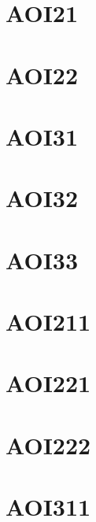 \documentclass[10pt,a4paper,twoside]{article}
\begin{document}

\section{AOI21}

\clearpage

\section{AOI22}

\clearpage

\section{AOI31}

\clearpage

\section{AOI32}

\clearpage

\section{AOI33}

\clearpage

\section{AOI211}

\clearpage

\section{AOI221}

\clearpage

\section{AOI222}

\clearpage

\section{AOI311}

\clearpage
\end{document}

